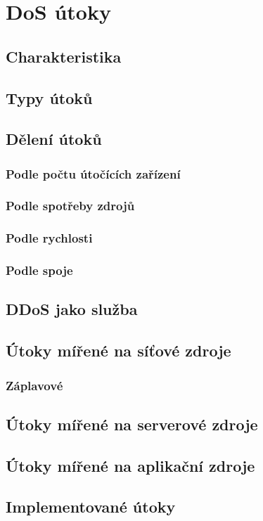 \chapter[DoS útoky]{DoS útoky}

\section{Charakteristika}

\section{Typy útoků}

\section{Dělení útoků}

\subsection{Podle počtu útočících zařízení}

\subsection{Podle spotřeby zdrojů}

\subsection{Podle rychlosti}

\subsection{Podle spoje}

\section{DDoS jako služba}

\section{Útoky mířené na síťové zdroje}

\subsection{Záplavové}

\section{Útoky mířené na serverové zdroje}

\section{Útoky mířené na aplikační zdroje}

\section{Implementované útoky}

